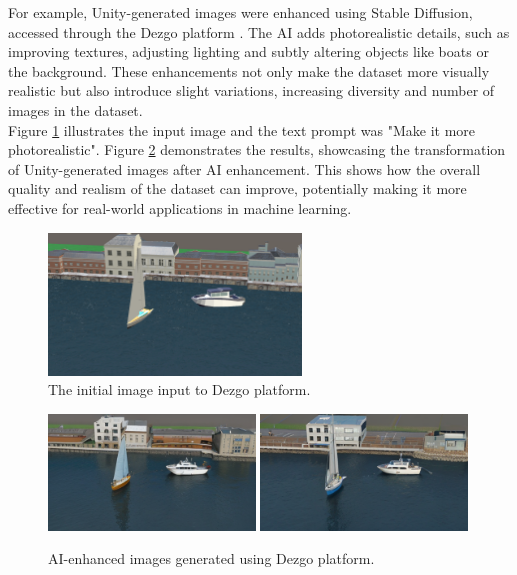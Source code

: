 \noindent For example, Unity-generated images were enhanced using Stable Diffusion, accessed through the Dezgo platform \cite{Dezgo2024}. The AI adds photorealistic details, such as improving textures, adjusting lighting and subtly altering objects like boats or the background. These enhancements not only make the dataset more visually realistic but also introduce slight variations, increasing diversity and number of images in the dataset.\\

\noindent Figure \ref{fig:ai_promt} illustrates the input image and the text prompt was "Make it more photorealistic". Figure \ref{fig:ai_enhanced} demonstrates the results, showcasing the transformation of Unity-generated images after AI enhancement. This shows how the overall quality and realism of the dataset can improve, potentially making it more effective for real-world applications in machine learning.

\begin{figure}[H]
\centering
\includegraphics[width=0.6\textwidth]{Figures/rgb_2.png}
\caption{The initial image input to Dezgo platform.}
\label{fig:ai_promt}
\end{figure}

\begin{figure}[H]
\centering
\includegraphics[width=0.49\textwidth]{Figures/results/photorealistic_3613113118.png}
\includegraphics[width=0.49\textwidth]{Figures/results/photorealistic_2942539231.png}
\caption{AI-enhanced images generated using Dezgo platform.}
\label{fig:ai_enhanced}
\end{figure}

